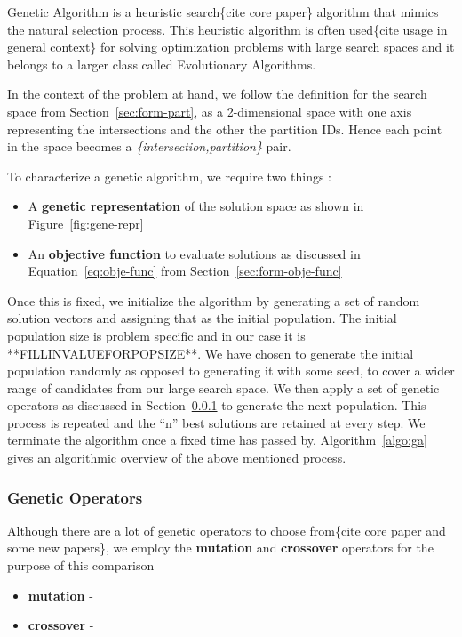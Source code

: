 Genetic Algorithm is a heuristic search\{cite core paper\} algorithm that mimics the natural selection process. This heuristic algorithm is often used\{cite usage in general context\} for solving optimization problems with large search spaces and it belongs to a larger class called Evolutionary Algorithms.

In the context of the problem at hand, we follow the definition for the search space from Section~\ref{sec:form-part}, as a 2-dimensional space with one axis representing the intersections and the other the partition IDs. Hence each point in the space becomes a \textit{\{intersection,partition\}} pair.

\noindent To characterize a genetic algorithm, we require two things :
\begin{itemize}
	\item A \textbf{genetic representation} of the solution space as shown in Figure~\ref{fig:gene-repr}
	\item An \textbf{objective function} to evaluate solutions as discussed in Equation~\ref{eq:obje-func} from Section~\ref{sec:form-obje-func}
\end{itemize}

Once this is fixed, we initialize the algorithm by generating a set of random solution vectors and assigning that as the initial population. The initial population size is problem specific and in our case it is **FILLINVALUEFORPOPSIZE**. We have chosen to generate the initial population randomly as opposed to generating it with some seed, to cover a wider range of candidates from our large search space. We then apply a set of genetic operators as discussed in Section~\ref{sec:gene-oper} to generate the next population. This process is repeated and the ``n'' best solutions are retained at every step. We terminate the algorithm once a fixed time has passed by. Algorithm~\ref{algo:ga} gives an algorithmic overview of the above mentioned process.

\subsubsection{Genetic Operators}
\label{sec:gene-oper}
Although there are a lot of genetic operators to choose from\{cite core paper and some new papers\}, we employ the \textbf{mutation} and \textbf{crossover} operators for the purpose of this comparison
\begin{itemize}
	\item \textbf{mutation} - 
	\item \textbf{crossover} - 
\end{itemize}